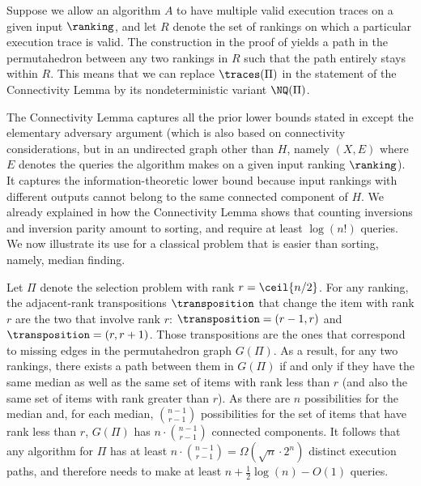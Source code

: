\begin{remark}\label{remark:connectivity}
Suppose we allow an algorithm $A$ to have multiple valid execution traces on a given input $\ranking$, and let $R$ denote the set of rankings on which a particular execution trace is valid. The construction in the proof of  yields a path in the permutahedron between any two rankings in $R$ such that the path entirely stays within $R$. This means that we can replace $\traces(\Pi)$ in the statement of the Connectivity Lemma by its nondeterministic variant $\NQ(\Pi)$.
\end{remark}

The Connectivity Lemma captures all the prior lower bounds stated in  except the elementary adversary argument (which is also based on connectivity considerations, but in an undirected graph other than $H$, namely $(X,E)$ where $E$ denotes the queries the algorithm makes on a given input ranking $\ranking$). It captures the
%
information-theoretic lower bound because input rankings with different outputs cannot belong to the same connected component of $H$. We already explained in  how the Connectivity Lemma shows that counting inversions and inversion parity amount to sorting, and require at least $\log(n!)$ queries. We now illustrate its use for a classical problem that is easier than sorting, 
%
namely, median finding.  %

Let $\Pi$ denote the selection problem with rank $r = \ceil{n/2}$. For any ranking, the adjacent-rank transpositions $\transposition$ that change the item with rank $r$ are the two that involve rank $r$: $\transposition = (r-1,r)$ and $\transposition = (r,r+1)$. Those transpositions are the ones that correspond to missing edges in the permutahedron graph $G(\Pi)$. As a result, for any two rankings, there exists a path between them in $G(\Pi)$ if and only if they have the same median as well as the same set of items with rank less than $r$ (and also the same set of items with rank greater than $r$). As there are $n$ possibilities for the median and, for each median, $\binom{n-1}{r-1}$ possibilities for the set of items that have rank less than $r$, $G(\Pi)$ has $n \cdot \binom{n-1}{r-1}$ connected components. It follows that any algorithm for $\Pi$ has at least $n \cdot \binom{n-1}{r-1} = \Omega(\sqrt{n}\cdot 2^n)$ distinct execution paths, and therefore needs to make at least $n + \frac{1}{2} \log(n) - O(1)$ queries. 

